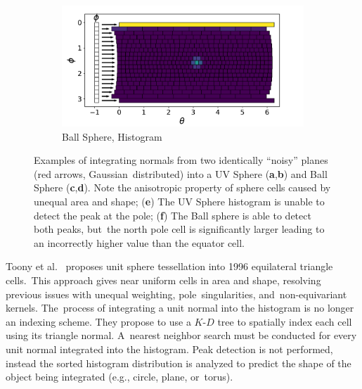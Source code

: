 \begin{figure}[H]
  \begin{subfigure}[t]{.49\linewidth}
    \centering\includegraphics[trim=0.1cm 0cm 0.99cm 0.6cm,width=.99\linewidth]{chapter_3_polylidar3d/imgs/ref_ga/strips_histogram.pdf}
    \caption{Ball Sphere, Histogram\label{fig:ch3_bg_ga_f}}\vspace{6pt}
  \end{subfigure}
  \caption[Example of integrating surface normals into Gaussian Accumulators]{Examples of integrating normals from two identically ``noisy'' planes (red arrows, Gaussian~distributed) into a UV Sphere (\textbf{a},\textbf{b}) and Ball Sphere (\textbf{c},\textbf{d}). Note the anisotropic property of sphere cells caused by unequal area and shape; (\textbf{e}) The UV Sphere histogram is unable to detect the peak at the pole; (\textbf{f}) The Ball sphere is able to detect both peaks, but~the north pole cell is significantly larger
  leading to an incorrectly higher value than the equator cell.}\label{fig:ch3_bg_ga}
\end{figure}


Toony et al.~\cite{toony_describing_2015} proposes unit sphere tessellation into 1996 equilateral triangle cells.~This approach gives near uniform cells in area and shape, resolving previous issues with unequal weighting, pole~singularities, and~non-equivariant kernels. The~process of integrating a unit normal into the histogram is no longer an indexing scheme. They propose to use a $K$-$D$ tree to spatially index each cell using its triangle normal.  A~nearest neighbor search must be conducted for every unit normal integrated into the histogram. Peak detection is not performed, instead the sorted histogram distribution is analyzed to predict the shape of the object being integrated (e.g., circle, plane, or~torus). 

